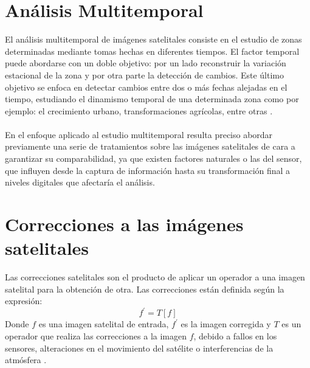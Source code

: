 \section{An\'alisis Multitemporal}
El an\'alisis multitemporal de im\'agenes satelitales consiste en el estudio de zonas determinadas mediante tomas hechas en diferentes tiempos. El factor temporal puede abordarse con un doble objetivo: por un lado reconstruir la variaci\'on estacional de la zona y por otra parte la detecci\'on de cambios. Este \'ultimo objetivo se enfoca en detectar cambios entre dos o m\'as
fechas alejadas en el tiempo, estudiando el dinamismo temporal de una determinada zona como por ejemplo: el crecimiento urbano, transformaciones agrícolas, entre otras \cite{salinero2002teledeteccion}.\\~\\
En el enfoque aplicado al estudio multitemporal resulta preciso abordar previamente una serie de tratamientos sobre las im\'agenes satelitales de cara a garantizar su comparabilidad, ya que existen factores naturales o las del sensor, que influyen desde la captura de informaci\'on hasta su transformaci\'on final a niveles digitales que afectar\'ia el an\'alisis.

\section{Correcciones a las im\'agenes satelitales}
Las correcciones satelitales son el producto de aplicar un operador a una imagen satelital para la obtenci\'on de otra. Las correcciones est\'an definida seg\'un la expresi\'on:
		\begin{equation}
			f^{'}=T[f]
		\end{equation} 
Donde $ f $ es una imagen satelital de entrada, $ f^{'} $ es la imagen corregida y $ T $ es un operador que realiza las correcciones a la imagen $ f $, debido a fallos en los sensores, alteraciones en el movimiento del sat\'elite o interferencias de la atm\'osfera \cite{teledUm}.

